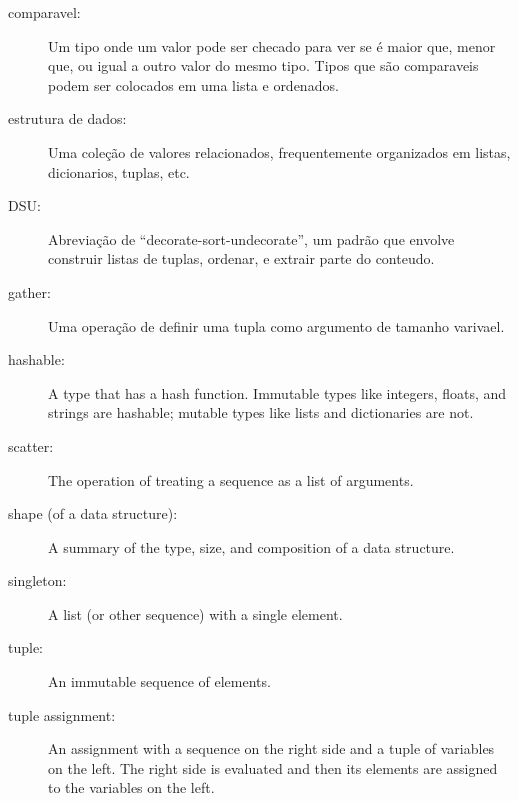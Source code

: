 \begin{description}

\item[comparavel:] Um tipo onde um valor pode ser checado para ver se é
maior que, menor que, ou igual a outro valor do mesmo tipo.
Tipos que são comparaveis podem ser colocados em uma lista e ordenados.

\item[estrutura de dados:] Uma coleção de valores relacionados, 
frequentemente organizados em listas, dicionarios, tuplas, etc.

\item[DSU:] Abreviação de ``decorate-sort-undecorate'', um
padrão que envolve construir listas de tuplas, ordenar, e 
extrair parte do conteudo.

\item[gather:] Uma operação de definir uma tupla como argumento 
de tamanho varivael.

\item[hashable:] A type that has a hash function.  Immutable
types like integers,
floats, and strings are hashable; mutable types like lists and
dictionaries are not.

\item[scatter:] The operation of treating a sequence as a list of
arguments.

\item[shape (of a data structure):] A summary of the type,
size, and composition of a data structure.

\item[singleton:] A list (or other sequence) with a single element.

\item[tuple:] An immutable sequence of elements.

\item[tuple assignment:] An assignment with a sequence on the
right side and a tuple of variables on the left.  The right
side is evaluated and then its elements are assigned to the
variables on the left.

\end{description}


